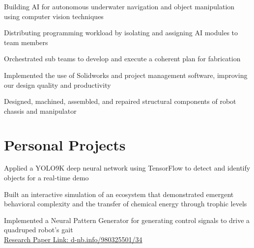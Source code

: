 \documentclass[]{deedy-resume-openfont}
\begin{document}
\begin{minipage}[t]{0.66\textwidth}
\begin{tightemize}
\item Building AI for autonomous underwater navigation and object manipulation using computer vision techniques
\item Distributing programming workload by isolating and assigning AI modules to team members
\end{tightemize}
\sectionsep

\begin{tightemize}
\item Orchestrated sub teams to develop and execute a coherent plan for fabrication
\item Implemented the use of Solidworks and project management software, improving our design quality and productivity
\item Designed, machined, assembled, and repaired structural components of robot chassis and manipulator
\end{tightemize}
\sectionsep


\section{Personal Projects}

\descript{}
\begin{tightemize}
\item Applied a YOLO9K deep neural network using TensorFlow to detect and identify objects for a real-time demo 
\end{tightemize}
\sectionsep

\descript{}
\begin{tightemize}
\item Built an interactive simulation of an ecosystem that demonstrated emergent behavioral complexity and the transfer of chemical energy through trophic levels
\item Implemented a Neural Pattern Generator for generating control signals to drive a quadruped robot's gait \\ \href{https://d-nb.info/980325501/34}{Research Paper Link: d-nb.info/980325501/34}
\end{tightemize}
\sectionsep

\end{minipage} 
\end{document}
